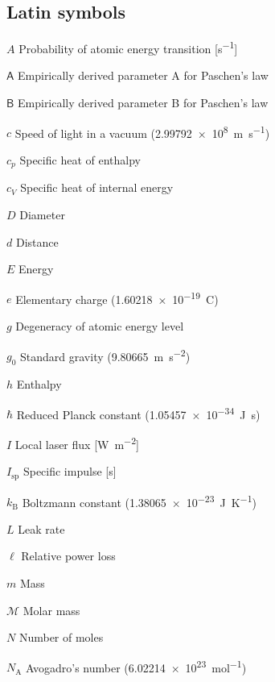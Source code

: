 \begin{multicols}{2}
    \section*{Latin symbols}
    \begin{nomlist}
        \item[$A$]              Probability of atomic energy transition [\unit{s^{-1}}]
        \item[$\mathsf{A}$]     Empirically derived parameter A for Paschen's law 
        \item[$\mathsf{B}$]     Empirically derived parameter B for Paschen's law 
        \item[$c$]              Speed of light in a vacuum (\qty{2.99792e8}{m.s^{-1}}) 
        \item[$c_p$]            Specific heat of enthalpy
        \item[$c_V$]            Specific heat of internal energy
        \item[$D$]              Diameter
        \item[$d$]              Distance
        \item[$E$]              Energy
        \item[$e$]              Elementary charge (\qty{1.60218e-19}{C})
        \item[$g$]              Degeneracy of atomic energy level
        \item[$g_0$]            Standard gravity (\qty{9.80665}{m.s^{-2}}) 
        \item[$h$]              Enthalpy
        \item[$\hbar$]          Reduced Planck constant (\qty{1.05457e-34}{J.s})
        \item[$I$]              Local laser flux [\unit{W.m^{-2}}]
        \item[$I_\text{sp}$]    Specific impulse [\unit{s}]
        \item[$k_\mathrm{B}$]   Boltzmann constant (\qty{1.38065e-23}{J.K^{-1}})
        \item[$L$]              Leak rate
        \item[$\ell$]           Relative power loss
        \item[$m$]              Mass
        \item[$\mathcal{M}$]    Molar mass
        \item[$N$]              Number of moles 
        \item[$N_\mathrm{A}$]   Avogadro's number (\qty{6.02214e+23}{mol^{-1}})

\end{nomlist}
\end{multicols}
